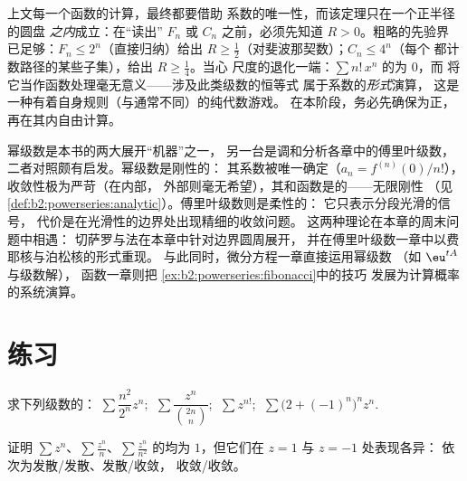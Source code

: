 \begin{remark}[形式级数与收敛级数]
上文每一个函数的计算，最终都要借助
系数的唯一性，而该定理只在一个正半径的圆盘
\emph{之内}成立：在“读出”
$F_n$ 或 $C_n$ 之前，必须先知道 $R > 0$。粗略的先验界
已足够：$F_n \leq 2^n$（直接归纳）给出 $R \geq
\frac12$（对斐波那契数）；$C_n \leq 4^n$（每个
都计数路径的某些子集），给出 $R \geq \frac14$。当心
尺度的退化一端：$\sum n!\,x^n$ 的为 $0$，而
将它当作函数处理毫无意义——涉及此类级数的恒等式
属于系数的\emph{形式}演算，
这是一种有着自身规则（与通常不同）的纯代数游戏。
在本阶段，务必先确保为正，
再在其内自由计算。
\end{remark}

\begin{remark}[本卷中的不同视角]
幂级数是本书的两大展开“机器”之一，
另一台是调和分析各章中的傅里叶级数，
二者对照颇有启发。幂级数是刚性的：
其系数被唯一确定（$a_n = f^{(n)}(0)/n!$），
收敛性极为严苛（在内部，
外部则毫无希望），其和函数是的——无限刚性
（见\cref{def:b2:powerseries:analytic}）。傅里叶级数则是柔性的：
它只表示分段光滑的信号，
代价是在光滑性的边界处出现精细的收敛问题。
这两种理论在本章的周末问题中相遇：
切萨罗与法在本章中针对边界圆周展开，
并在傅里叶级数一章中以费耶核与泊松核的形式重现。
与此同时，微分方程一章直接运用幂级数
（如 $\eu^{tA}$ 与级数解），
函数一章则把
\cref{ex:b2:powerseries:fibonacci}中的技巧
发展为计算概率的系统演算。
\end{remark}

\section{练习}

\begin{exercise}[$\star$]\label{exo:b2:powerseries:1}
求下列级数的：
$\sum \dfrac{n^2}{2^n}z^n$; $\;\sum \dfrac{z^n}{\binom{2n}{n}}$;
$\;\sum z^{n!}$; $\;\sum \bigl(2 + (-1)^n\bigr)^n z^n$.
\end{exercise}

\begin{exercise}[$\star$]\label{exo:b2:powerseries:2}
证明 $\sum z^n$、$\sum \frac{z^n}{n}$、$\sum \frac{z^n}{n^2}$
的均为 $1$，但它们在 $z = 1$ 与 $z = -1$ 处表现各异：
依次为发散/发散、发散/收敛，
收敛/收敛。
\end{exercise}

